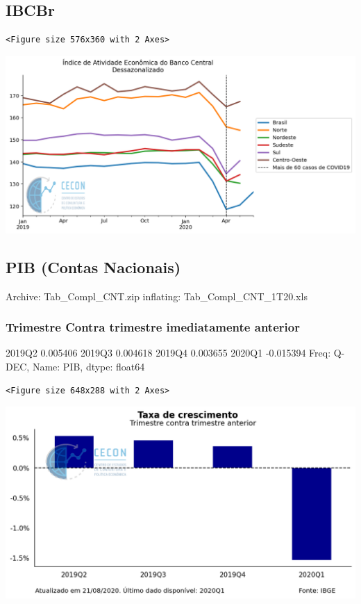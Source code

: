 \documentclass[11pt]{article}
\begin{document}
\subsection{IBCBr}
\label{sec:org72b8991}

\begin{verbatim}
<Figure size 576x360 with 2 Axes>
\end{verbatim}


\begin{center}
\includegraphics[width=.9\linewidth]{obipy-resources/62e383af79e91b63c7fc98dd7fb55b3c3ececcb9/867e8a85521aa7667c388ddb9c5027a1ada952bb.png}
\end{center}

\subsection{PIB (Contas Nacionais)}
\label{sec:org4af1a2d}

Archive:  Tab\_Compl\_CNT.zip
  inflating: Tab\_Compl\_CNT\_1T20.xls  

\subsubsection{Trimestre Contra trimestre imediatamente anterior}
\label{sec:org9bdbe0c}

2019Q2    0.005406
2019Q3    0.004618
2019Q4    0.003655
2020Q1   -0.015394
Freq: Q-DEC, Name: PIB, dtype: float64

\begin{verbatim}
<Figure size 648x288 with 2 Axes>
\end{verbatim}


\begin{center}
\includegraphics[width=.9\linewidth]{obipy-resources/62e383af79e91b63c7fc98dd7fb55b3c3ececcb9/ae1515a7b487b55149c37fa44d319f5deb1387b7.png}
\end{center}
\end{document}
